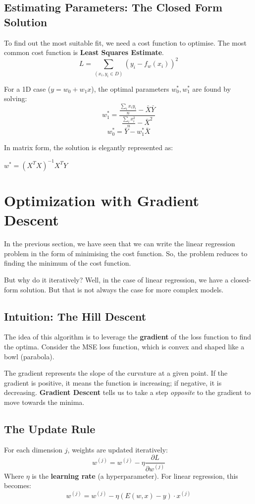 \documentclass[11pt,fleqn]{book}
\begin{document}
\section{Estimating Parameters: The Closed Form Solution}
To find out the most suitable fit, we need a cost function to optimise. The most common cost function is \textbf{Least Squares Estimate}.
\[L = \sum_{(x_i,y_i \in D)} (y_i - f_w(x_i))^2\]

For a 1D case ($y = w_0 + w_1x$), the optimal parameters $w_0^*, w_1^*$ are found by solving:
\[w_1^* = \frac{\frac{\sum_{i}x_iy_i}{n} - \bar{X}\bar{Y}}{\frac{\sum_{i}x_i^2}{n} - \bar{X}^2}\]
\[w_0^* = \bar{Y} - w_1^*\bar{X}\]

In matrix form, the solution is elegantly represented as:
\begin{center}
    \Large{\textbf{\color{accent-primary} $w^* = (X^TX)^{-1}X^TY$}}
\end{center}

\chapter{Optimization with Gradient Descent}

In the previous section, we have seen that we can write the linear regression problem in the form of minimising the cost function. So, the problem reduces to finding the minimum of the cost function. 

But why do it iteratively? Well, in the case of linear regression, we have a closed-form solution. But that is not always the case for more complex models.

\section{Intuition: The Hill Descent}
The idea of this algorithm is to leverage the \textbf{gradient} of the loss function to find the optima. Consider the MSE loss function, which is convex and shaped like a bowl (parabola).

The gradient represents the slope of the curvature at a given point. If the gradient is positive, it means the function is increasing; if negative, it is decreasing. \textbf{Gradient Descent} tells us to take a step \textit{opposite} to the gradient to move towards the minima.

\section{The Update Rule}
For each dimension $j$, weights are updated iteratively:
\[w^{(j)} = w^{(j)} - \eta \frac{\partial L}{\partial w^{(j)}}\]
Where $\eta$ is the \textbf{learning rate} (a hyperparameter). For linear regression, this becomes:
\[w^{(j)} = w^{(j)} - \eta (E(w,x) - y) \cdot x^{(j)}\]
\end{document}
